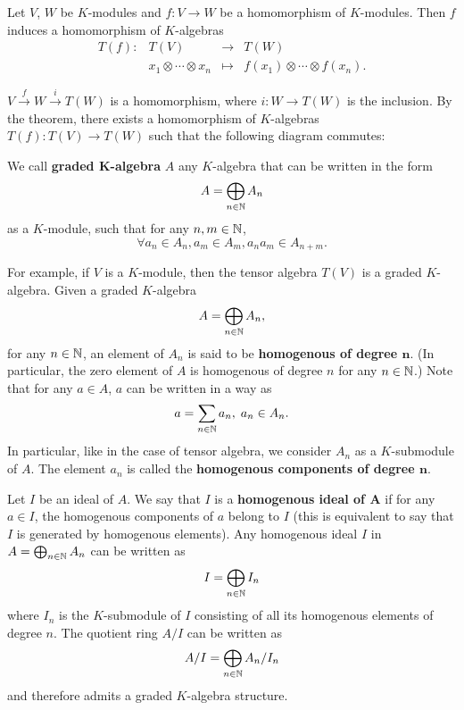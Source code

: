 \begin{corollaryenv}
    Let $V$, $W$ be $K$-modules and $f : V\rightarrow W$ be a homomorphism of $K$-modules.
    Then $f$ induces a homomorphism of $K$-algebras 
    $$ \begin{array}{rrcl}
        T(f) : & T(V) & \longrightarrow & T(W)\\
        & x_1 \otimes \cdots \otimes x_n & \longmapsto & f(x_1) \otimes \cdots \otimes f(x_n).
    \end{array}$$
\end{corollaryenv}
\begin{proofenv}
    $V \overset{f}{\longrightarrow} W \overset{i}{\longrightarrow} T(W) $ is a homomorphism, where $i: W \longrightarrow T(W)$ is the inclusion.
    By the theorem, there exists a homomorphism of $K$-algebras $T(f) : T(V) \rightarrow T(W)$ such that the following diagram commutes:
    \begin{center}    
    \end{center}
\end{proofenv}

\begin{remark}
    We call \textbf{graded $\bm{K}$-algebra} $A$ any $K$-algebra that can be written in the form
    $$ A = \bigoplus_{n\in \mathbb{N}} A_n$$
    as a $K$-module, such that for any $n,m \in \mathbb{N}$,
    $$ \forall a_n \in A_n, a_m \in A_m, a_n a_m \in A_{n+m}.$$
    
    \quad For example, if $V$ is a $K$-module, then the tensor algebra $T(V)$ is a graded $K$-algebra.
    Given a graded $K$-algebra
    $$ A = \bigoplus_{n\in \mathbb{N}} A_n,$$
    for any $n \in \mathbb{N}$, an element of $A_n$ is said to be \textbf{homogenous of degree $\bm{n}$}.
    (In particular, the zero element of $A$ is homogenous of degree $n$ for any $n\in \mathbb{N}$.)
    Note that for any $a \in A$, $a$ can be written in a  way as
    $$ a = \sum_{n\in \mathbb{N}} a_n,\; a_n \in A_n.$$
    In particular, like in the case of tensor algebra, we consider $A_n$ as a $K$-submodule of $A$.
    The element $a_n$ is called the \textbf{homogenous components of degree $\bm{n}$}.
    
    \quad Let $I$ be an ideal of $A$.
    We say that $I$ is a \textbf{homogenous ideal of $\bm{A}$} if for any $a \in I$, the homogenous components of $a$ belong to $I$ (this is equivalent to say that $I$ is generated by homogenous elements).
    Any homogenous ideal $I$ in $A = \bigoplus_{n \in \mathbb{N}} A_n$ can be written as 
    $$ I = \bigoplus_{n\in \mathbb{N}} I_n$$
    where $I_n$ is the $K$-submodule of $I$ consisting of all its homogenous elements of degree $n$.
    The quotient ring $A/I$ can be written as
    $$ A/I = \bigoplus_{n\in \mathbb{N}} A_n/I_n$$
    and therefore admits a graded $K$-algebra structure.
\end{remark}


